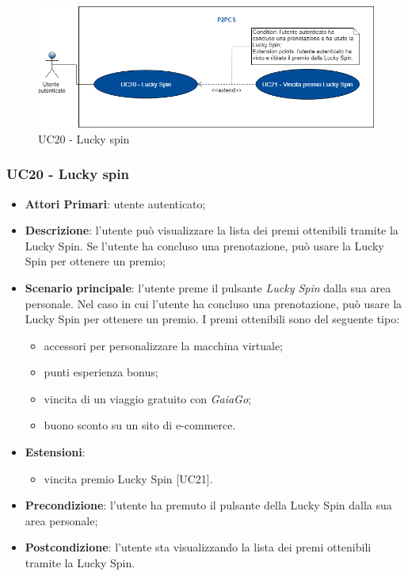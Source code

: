 \begin{figure}[h]
	\includegraphics[width=13cm]{res/images/UC20Luckyspin.png}
	\centering
	\caption{UC20 - Lucky spin}
\end{figure}
\subsubsection{UC20 - Lucky spin}
\begin{itemize}
	\item \textbf{Attori Primari}: utente autenticato;
	\item \textbf{Descrizione}:	l'utente può visualizzare la lista dei premi ottenibili tramite la Lucky Spin\glo. Se l'utente ha concluso una prenotazione, può usare la Lucky Spin per ottenere un premio;
	\item \textbf{Scenario principale}: l'utente preme il pulsante \textit{Lucky Spin} dalla sua area personale. Nel caso in cui l'utente ha concluso una prenotazione, può usare la Lucky Spin per ottenere un premio. I premi ottenibili sono del seguente tipo:
	\begin{itemize}
		\item accessori per personalizzare la macchina virtuale;
		\item punti esperienza bonus;
		\item vincita di un viaggio gratuito con \textit{GaiaGo};
		\item buono sconto su un sito di e-commerce.	
	\end{itemize}
	\item \textbf{Estensioni}: 
	\begin{itemize}
		\item vincita premio Lucky Spin [UC21].
	\end{itemize}
	\item \textbf{Precondizione}: l'utente ha premuto il pulsante della Lucky Spin dalla sua area personale;
	\item \textbf{Postcondizione}: l'utente sta visualizzando la lista dei premi ottenibili tramite la Lucky Spin.
\end{itemize}
